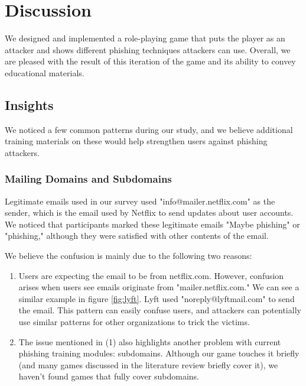 



\chapter{Discussion}
We designed and implemented a role-playing game that puts the player as an attacker and shows different phishing techniques attackers can use. Overall, we are pleased with the result of this iteration of the game and its ability to convey educational materials.

\section{Insights}
We noticed a few common patterns during our study, and we believe additional training materials on these would help strengthen users against phishing attackers.

\subsection{Mailing Domains and Subdomains}
Legitimate emails used in our survey used "info@mailer.netflix.com" as the sender, which is the email used by Netflix to send updates about user accounts. We noticed that participants marked these legitimate emails "Maybe phishing" or "phishing," although they were satisfied with other contents of the email.

We believe the confusion is mainly due to the following two reasons:

\begin{enumerate}
    \item Users are expecting the email to be from netflix.com. However, confusion arises when users see emails originate from "mailer.netflix.com." We can see a similar example in figure \ref{fig:lyft}. Lyft used "noreply@lyftmail.com" to send the email. This pattern can easily confuse users, and attackers can potentially use similar patterns for other organizations to trick the victims.

    \item The issue mentioned in (1) also highlights another problem with current phishing training modules: subdomains. Although our game touches it briefly (and many games discussed in the literature review briefly cover it), we haven't found games that fully cover subdomains.
\end{enumerate}

